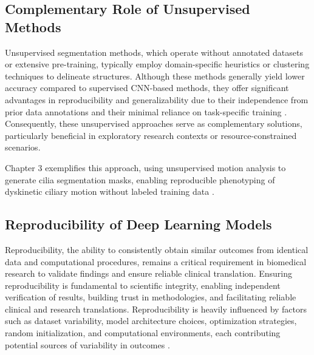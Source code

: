 \documentclass[./dissertation.tex]{subfiles}
\begin{document}
\subsection{Complementary Role of Unsupervised Methods}
Unsupervised segmentation methods, which operate without annotated datasets or extensive pre-training, typically employ domain-specific heuristics or clustering techniques to delineate structures. Although these methods generally yield lower accuracy compared to supervised CNN-based methods, they offer significant advantages in reproducibility and generalizability due to their independence from prior data annotations and their minimal reliance on task-specific training \cite{ji2019invariant}. Consequently, these unsupervised approaches serve as complementary solutions, particularly beneficial in exploratory research contexts or resource-constrained scenarios.

Chapter 3 exemplifies this approach, using unsupervised motion analysis to generate cilia segmentation masks, enabling reproducible phenotyping of dyskinetic ciliary motion without labeled training data \cite{vaezi2024training}.


\subsection{Reproducibility of Deep Learning Models}
Reproducibility, the ability to consistently obtain similar outcomes from identical data and computational procedures, remains a critical requirement in biomedical research to validate findings and ensure reliable clinical translation. Ensuring reproducibility is fundamental to scientific integrity, enabling independent verification of results, building trust in methodologies, and facilitating reliable clinical and research translations. Reproducibility is heavily influenced by factors such as dataset variability, model architecture choices, optimization strategies, random initialization, and computational environments, each contributing potential sources of variability in outcomes \cite{maier2018rankings}.
\end{document}
